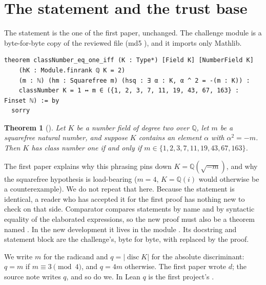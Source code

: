 \documentclass[11pt]{article}
\newtheorem{theorem}{Theorem}[section]
\theoremstyle{definition}
\newcommand{\Q}{\mathbb{Q}}
\newcommand{\disc}{\operatorname{disc}}
\begin{document}
\section{The statement and the trust base}\label{sec:statement}

The statement is the one of the first paper, unchanged. The challenge module  is a byte-for-byte copy of the reviewed file (md5 ), and it imports only Mathlib.

\begin{lstlisting}
theorem classNumber_eq_one_iff (K : Type*) [Field K] [NumberField K]
    (hK : Module.finrank ℚ K = 2)
    (m : ℕ) (hm : Squarefree m) (hsq : ∃ α : K, α ^ 2 = -(m : K)) :
    classNumber K = 1 ↔ m ∈ ({1, 2, 3, 7, 11, 19, 43, 67, 163} : Finset ℕ) := by
  sorry
\end{lstlisting}

\begin{theorem}[]\label{thm:main}
Let $K$ be a number field of degree two over $\Q$, let $m$ be a squarefree natural number, and suppose $K$ contains an element $\alpha$ with $\alpha^2 = -m$. Then $K$ has class number one if and only if $m \in \{1, 2, 3, 7, 11, 19, 43, 67, 163\}$.
\end{theorem}

The first paper explains why this phrasing pins down $K = \Q(\sqrt{-m})$, and why the squarefree hypothesis is load-bearing ($m = 4$, $K = \Q(i)$ would otherwise be a counterexample). We do not repeat that here. Because the statement is identical, a reader who has accepted it for the first proof has nothing new to check on that side. Comparator compares statements by name and by syntactic equality of the elaborated expressions, so the new proof must also be a theorem named . In the new development it lives in the module . Its docstring and statement block are the challenge's, byte for byte, with  replaced by the proof.

We write $m$ for the radicand and $q = |\disc K|$ for the absolute discriminant: $q = m$ if $m \equiv 3 \pmod 4$, and $q = 4m$ otherwise. The first paper wrote $d$; the source note writes $q$, and so do we. In Lean $q$ is the first project's .
\end{document}
